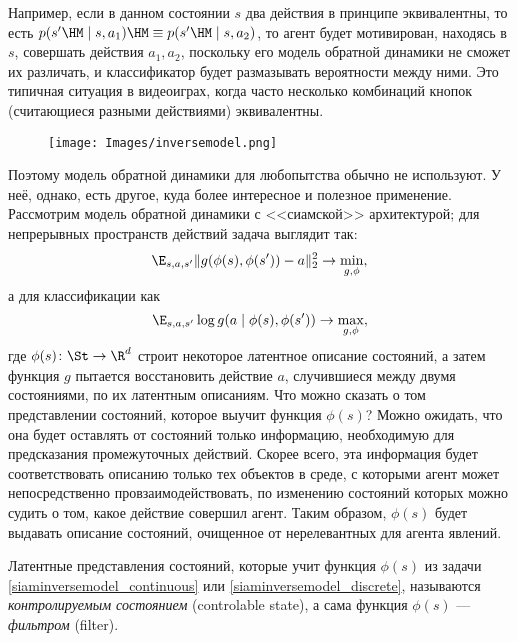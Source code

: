 \begin{example}
Например, если в данном состоянии $s$ два действия в принципе эквивалентны, то есть $p(s' \HM\mid s, a_1) \HM\equiv p(s' \HM\mid s, a_2)$, то агент будет мотивирован, находясь в $s$, совершать действия $a_1, a_2$, поскольку его модель обратной динамики не сможет их различать, и классификатор будет размазывать вероятности между ними. Это типичная ситуация в видеоиграх, когда часто несколько комбинаций кнопок (считающиеся разными действиями) эквивалентны.
\end{example}

\begin{wrapfigure}{l}{0.5\textwidth}
\centering
\texttt{[image: Images/inversemodel.png]}
\vspace{-0.4cm}
\end{wrapfigure}

Поэтому модель обратной динамики для любопытства обычно не используют. У неё, однако, есть другое, куда более интересное и полезное применение. Рассмотрим модель обратной динамики с <<сиамской>> архитектурой; для непрерывных пространств действий задача выглядит так:
\begin{equation}\label{siaminversemodel_continuous}
\E_{s, a, s'} \|g(\phi(s), \phi(s')) - a\|^2_2 \to \min_{g, \phi},
\end{equation}
а для классификации как
\begin{equation}\label{siaminversemodel_discrete}
\E_{s, a, s'} \log g(a \mid \phi(s), \phi(s')) \to \max_{g, \phi},
\end{equation}
где $\phi(s) \colon \St \to \R^d$ строит некоторое латентное описание состояний, а затем функция $g$ пытается восстановить действие $a$, случившиеся между двумя состояниями, по их латентным описаниям. Что можно сказать о том представлении состояний, которое выучит функция $\phi(s)$? Можно ожидать, что она будет оставлять от состояний только информацию, необходимую для предсказания промежуточных действий. Скорее всего, эта информация будет соответствовать описанию только тех объектов в среде, с которыми агент может непосредственно провзаимодействовать, по изменению состояний которых можно судить о том, какое действие совершил агент. Таким образом, $\phi(s)$ будет выдавать описание состояний, очищенное от нерелевантных для агента явлений.

\begin{definition}
Латентные представления состояний, которые учит функция $\phi(s)$ из задачи \eqref{siaminversemodel_continuous} или \eqref{siaminversemodel_discrete}, называются \emph{контролируемым состоянием} (controlable state), а сама функция $\phi(s)$ --- \emph{фильтром} (filter).
\end{definition}

